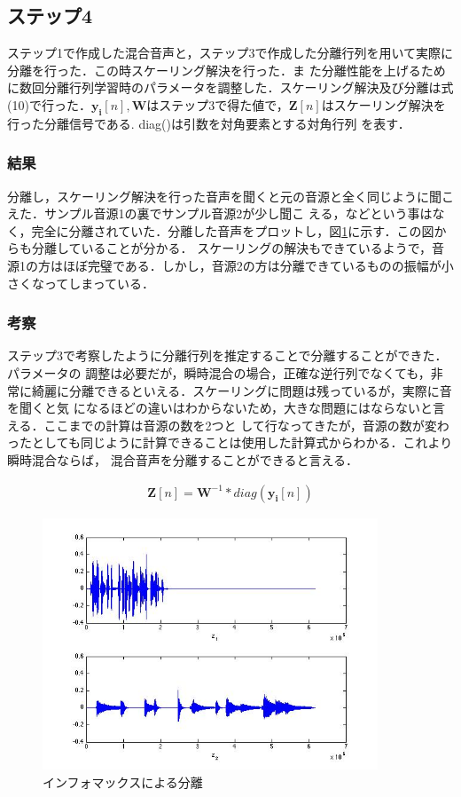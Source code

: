 \documentclass[a4j]{jarticle}
\begin{document}
\subsection{ステップ4}
ステップ1で作成した混合音声と，ステップ3で作成した分離行列を用いて実際に分離を行った．この時スケーリング解決を行った．ま
た分離性能を上げるために数回分離行列学習時のパラメータを調整した．スケーリング解決及び分離は式(10)で行った．$\bm{y_i}[n],
\bm{W}$はステップ3で得た値で，$\bm{Z}[n]$はスケーリング解決を行った分離信号である. diag()は引数を対角要素とする対角行列
を表す．
\subsubsection{結果}
分離し，スケーリング解決を行った音声を聞くと元の音源と全く同じように聞こえた．サンプル音源1の裏でサンプル音源2が少し聞こ
える，などという事はなく，完全に分離されていた．分離した音声をプロットし，図\ref{k1s4}に示す．この図からも分離していることが分かる．
スケーリングの解決もできているようで，音源1の方はほぼ完璧である．しかし，音源2の方は分離できているものの振幅が小さくなってしまっている．
\subsubsection{考察}
ステップ3で考察したように分離行列を推定することで分離することができた．パラメータの
調整は必要だが，瞬時混合の場合，正確な逆行列でなくても，非常に綺麗に分離できるといえる．スケーリングに問題は残っているが，実際に音を聞くと気
になるほどの違いはわからないため，大きな問題にはならないと言える．ここまでの計算は音源の数を2つと
して行なってきたが，音源の数が変わったとしても同じように計算できることは使用した計算式からわかる．これより瞬時混合ならば，
混合音声を分離することができると言える．

\begin{eqnarray}
 \bm{Z}[n] = \bm{W}^{-1} * diag(\bm{y_i}[n])
\end{eqnarray}

\begin{figure}[htb]
 \begin{center}
  \includegraphics[width=10cm, clip, bb=0 0 560 420]{pic/k1s4.jpg}
  \caption{インフォマックスによる分離}
  \label{k1s4}
 \end{center}
\end{figure}
\end{document}
